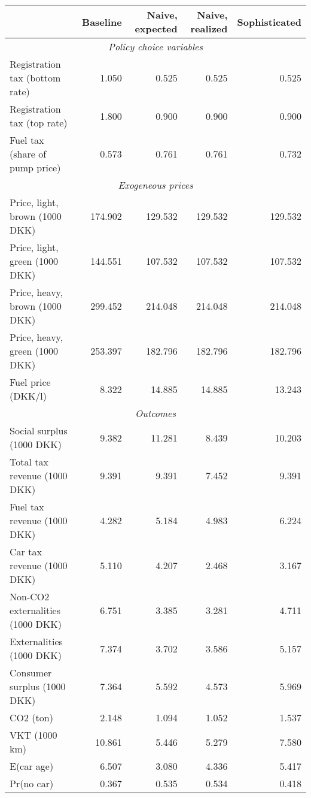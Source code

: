 

\begin{tabular}{lrrrr} 
\toprule 
                                         &     Baseline& Naive, expected& Naive, realized& Sophisticated \\ 
\midrule 
\multicolumn{5}{c}{\emph{Policy choice variables}} \\ 
\midrule
          Registration tax (bottom rate) &        1.050&        0.525&        0.525&        0.525 \\ 
             Registration tax (top rate) &        1.800&        0.900&        0.900&        0.900 \\ 
          Fuel tax (share of pump price) &        0.573&        0.761&        0.761&        0.732 \\ 
\midrule 
\multicolumn{5}{c}{\emph{Exogeneous prices}} \\ 
\midrule
          Price, light, brown (1000 DKK) &      174.902&      129.532&      129.532&      129.532 \\ 
          Price, light, green (1000 DKK) &      144.551&      107.532&      107.532&      107.532 \\ 
          Price, heavy, brown (1000 DKK) &      299.452&      214.048&      214.048&      214.048 \\ 
          Price, heavy, green (1000 DKK) &      253.397&      182.796&      182.796&      182.796 \\ 
                      Fuel price (DKK/l) &        8.322&       14.885&       14.885&       13.243 \\ 
\midrule 
\multicolumn{5}{c}{\emph{Outcomes}} \\ 
\midrule
               Social surplus (1000 DKK) &        9.382&       11.281&        8.439&       10.203 \\ 
            Total tax revenue (1000 DKK) &        9.391&        9.391&        7.452&        9.391 \\ 
             Fuel tax revenue (1000 DKK) &        4.282&        5.184&        4.983&        6.224 \\ 
              Car tax revenue (1000 DKK) &        5.110&        4.207&        2.468&        3.167 \\ 
        Non-CO2 externalities (1000 DKK) &        6.751&        3.385&        3.281&        4.711 \\ 
                Externalities (1000 DKK) &        7.374&        3.702&        3.586&        5.157 \\ 
             Consumer surplus (1000 DKK) &        7.364&        5.592&        4.573&        5.969 \\ 
                               CO2 (ton) &        2.148&        1.094&        1.052&        1.537 \\ 
                           VKT (1000 km) &       10.861&        5.446&        5.279&        7.580 \\ 
                              E(car age) &        6.507&        3.080&        4.336&        5.417 \\ 
                              Pr(no car) &        0.367&        0.535&        0.534&        0.418 \\ 
\bottomrule 
\end{tabular}
